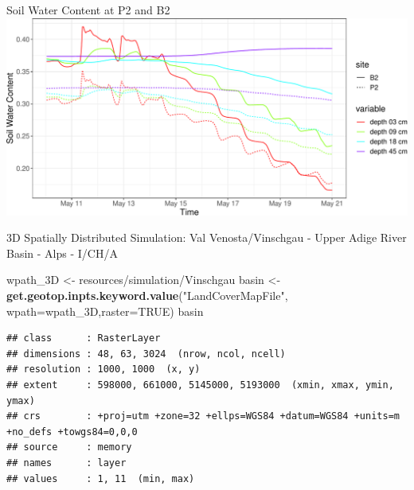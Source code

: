 \documentclass[
  ignorenonframetext,
]{beamer}
\newenvironment{Shaded}{\begin{snugshade}}{\end{snugshade}}
\newcommand{\DataTypeTok}[1]{\textcolor[rgb]{0.13,0.29,0.53}{#1}}
\newcommand{\KeywordTok}[1]{\textcolor[rgb]{0.13,0.29,0.53}{\textbf{#1}}}
\newcommand{\NormalTok}[1]{#1}
\newcommand{\OtherTok}[1]{\textcolor[rgb]{0.56,0.35,0.01}{#1}}
\newcommand{\StringTok}[1]{\textcolor[rgb]{0.31,0.60,0.02}{#1}}
\begin{document}
\begin{frame}{Soil Water Content at P2 and B2}
\protect\hypertarget{soil-water-content-at-p2-and-b2}{}
\includegraphics{presentation_files/figure-beamer/unnamed-chunk-8-1.pdf}
\end{frame}

\begin{frame}[fragile]{3D Spatially Distributed Simulation: Val
Venosta/Vinschgau - Upper Adige River Basin - Alps - I/CH/A}
\protect\hypertarget{d-spatially-distributed-simulation-val-venostavinschgau---upper-adige-river-basin---alps---icha}{}
\begin{Shaded}
\begin{Highlighting}[]
\NormalTok{wpath\_3D <{-}}\StringTok{ \textquotesingle{}resources/simulation/Vinschgau\textquotesingle{}}
\NormalTok{basin <{-}}\StringTok{ }\KeywordTok{get.geotop.inpts.keyword.value}\NormalTok{(}\StringTok{"LandCoverMapFile"}\NormalTok{,}
              \DataTypeTok{wpath=}\NormalTok{wpath\_3D,}\DataTypeTok{raster=}\OtherTok{TRUE}\NormalTok{)}
\NormalTok{basin}
\end{Highlighting}
\end{Shaded}

\begin{verbatim}
## class      : RasterLayer 
## dimensions : 48, 63, 3024  (nrow, ncol, ncell)
## resolution : 1000, 1000  (x, y)
## extent     : 598000, 661000, 5145000, 5193000  (xmin, xmax, ymin, ymax)
## crs        : +proj=utm +zone=32 +ellps=WGS84 +datum=WGS84 +units=m +no_defs +towgs84=0,0,0 
## source     : memory
## names      : layer 
## values     : 1, 11  (min, max)
\end{verbatim}
\end{frame}
\end{document}
